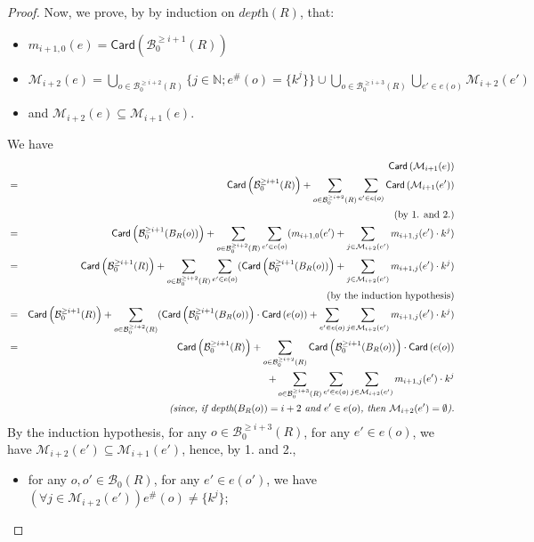 \documentclass{article}
\theoremstyle{plain}
\newcommand{\Nat}{\ensuremath{\mathbb{N}}}
\newcommand{\Card}[1]{\textsf{Card}\left( #1 \right)}
\newcommand{\boxesatzero}[1]{\mathcal{B}_{0}(#1)}
\newcommand{\boxesatzerogeq}[2]{\mathcal{B}_0^{\geq #2}(#1)}
\begin{document}
\begin{proof}
Now, we prove, by by induction on $\textit{depth}(R)$, that:
\begin{itemize}
\item $m_{i+1, 0}(e) = \Card{\boxesatzerogeq{R}{i+1}}$
\item $\mathcal{M}_{i+2}(e) = \bigcup_{o \in \boxesatzerogeq{R}{i+2}} \{ j \in \Nat ; e^\#(o) = \{ k^j \} \} \cup \bigcup_{o \in \boxesatzerogeq{R}{i+3}} \bigcup_{e' \in e(o)} \mathcal{M}_{i+2}(e')$
\item and $\mathcal{M}_{i+2}(e) \subseteq \mathcal{M}_{i+1}(e)$.
\end{itemize}
We have
\begin{eqnarray*}
& & \Card{\mathcal{M}_{i+1}(e)} \\
& = & \Card{\boxesatzerogeq{R}{i+1}} + \sum_{o \in \boxesatzerogeq{R}{i+2}} \sum_{e' \in e(o)} \Card{\mathcal{M}_{i+1}(e')} \\
& & \textrm{(by 1. and 2.)}\\
& = & \Card{\boxesatzerogeq{B_R(o)}{i+1}} + \sum_{o \in \boxesatzerogeq{R}{i+2}} \sum_{e' \in e(o)} (m_{i+1, 0}(e') + \sum_{j \in \mathcal{M}_{i+2}(e')} m_{i+1, j}(e') \cdot k^j)\\
& = & \Card{\boxesatzerogeq{R}{i+1}} + \sum_{o \in \boxesatzerogeq{R}{i+2}} \sum_{e' \in e(o)} (\Card{\boxesatzerogeq{B_R(o)}{i+1}} + \sum_{j \in \mathcal{M}_{i+2}(e')} m_{i+1, j}(e') \cdot k^j)\\
& & \textrm{(by the induction hypothesis)} \allowdisplaybreaks \\
& = & \Card{\boxesatzerogeq{R}{i+1}} + \sum_{o \in \boxesatzerogeq{R}{i+2}} (\Card{\boxesatzerogeq{B_R(o)}{i+1}} \cdot \Card{e(o)} + \sum_{e' \in e(o)} \sum_{j \in \mathcal{M}_{i+2}(e')} m_{i+1, j}(e') \cdot k^j) \allowdisplaybreaks \\
& = & \Card{\boxesatzerogeq{R}{i+1}} + \sum_{o \in \boxesatzerogeq{R}{i+2}} \Card{\boxesatzerogeq{B_R(o)}{i+1}} \cdot \Card{e(o)} \\
& & + \sum_{o \in \boxesatzerogeq{R}{i+3}} \sum_{e' \in e(o)} \sum_{j \in \mathcal{M}_{i+2}(e')} m_{i+1, j}(e') \cdot k^j \\
& & \textit{(since, if $\textit{depth}(B_R(o)) = i+2$ and $e' \in e(o)$, then $\mathcal{M}_{i+2}(e') = \emptyset$).}
\end{eqnarray*}
By the induction hypothesis, for any $o \in \boxesatzerogeq{R}{i+3}$, for any $e' \in e(o)$, we have $\mathcal{M}_{i+2}(e') \subseteq \mathcal{M}_{i+1}(e')$, hence, by 1. and 2., 
\begin{itemize}
\item for any $o, o' \in \boxesatzero{R}$, for any $e' \in e(o')$, we have $(\forall j \in \mathcal{M}_{i+2}(e')) e^\#(o) \not= \{ k^j \}$;

\end{itemize}
\end{proof}
\end{document}
